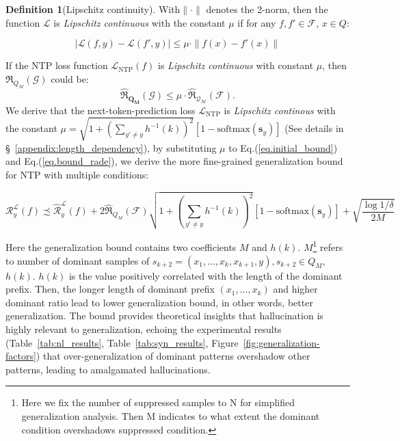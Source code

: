 \textbf{Definition 1}(Lipschitz continuity).
With$\|\cdot\|$ denotes the 2-norm, then the function $\mathcal{L}$ is \textit{Lipschitz continuous} with the constant $\mu$ if for any $f, f' \in \mathcal{F}$, $x \in Q$:
\begin{small}
\begin{equation}
|\mathcal{L}(f, y) - \mathcal{L}(f', y)| \leq \mu \cdot \|f(x) - f'(x)\|
\end{equation}
\end{small}
If the NTP loss function $\mathcal{L}_\mathrm{NTP}(f)$ is \textit{Lipschitz continuous} with constant $\mu$, then $\Re_{Q_M}(\mathcal{G})$ could be:
\begin{equation}
\label{eq.bound_rade}
\hat{{\Re}}_{\mathbf{Q_M}}(\mathcal{G}) \le \mu \cdot \hat{{\Re}}_{\mathcal{Q_M}}(\mathcal{F}).
    \end{equation}
We derive that the next-token-prediction loss $\mathcal{L}_\mathrm{NTP}$ is \textit{Lipschitz continous} with the constant $\mu=\sqrt{1 + \left( \sum_{y' \neq y} h^{-1}(k) \right)^2} \left[ 1 - \mathrm{softmax}\left( \boldsymbol{s}_{y} \right) \right]$ (See details in \S~\ref{appendix:length_dependency}), by substituting $\mu$ to Eq.(\ref{eq.initial_bound}) and Eq.(\ref{eq.bound_rade}), we derive the more fine-grained generalization bound for NTP with multiple conditions:
\begin{small}
\begin{equation}
\label{eq.final_bound}
\mathcal{R}^{\mathcal{L}}_y(f) \precsim \widehat{\mathcal{R}}^{\mathcal{L}}_y(f) + 2\widehat{\Re}_{Q_M}(\mathcal{F})\sqrt{1 + \left( \sum_{y' \neq y} h^{-1}(k) \right)^2} \left[ 1 - \mathrm{softmax}\left( \boldsymbol{s}_{y} \right) \right] + \sqrt{\frac{\log 1/\delta}{2M}} 
\end{equation}
\end{small}
Here the generalization bound contains two coefficients $M$ and $h(k)$. $M$\footnote{Here we fix the number of suppressed samples to N for simplified generalization analysis. Then M indicates to what extent the dominant condition overshadows suppressed condition.} refers to number of dominant samples of $s_{k+2} = ({x}_1, \dots, {x}_k, {x}_{k+1}, y), s_{k+2} \in Q_{M}$, $h(k)$. $h(k)$ is the value positively correlated with the length of the dominant prefix. Then, the longer length of dominant prefix $({x}_1, \dots, {x}_k)$ and higher dominant ratio lead to lower generalization bound, in other words, better generalization.
The bound provides theoretical insights that hallucination is highly relevant to generalization, 
echoing the experimental results (Table~\ref{tab:nl_results}, Table~\ref{tab:syn_results}, Figure~\ref{fig:generalization-factors}) that over-generalization of dominant patterns overshadow other patterns, leading to amalgamated hallucinations.


